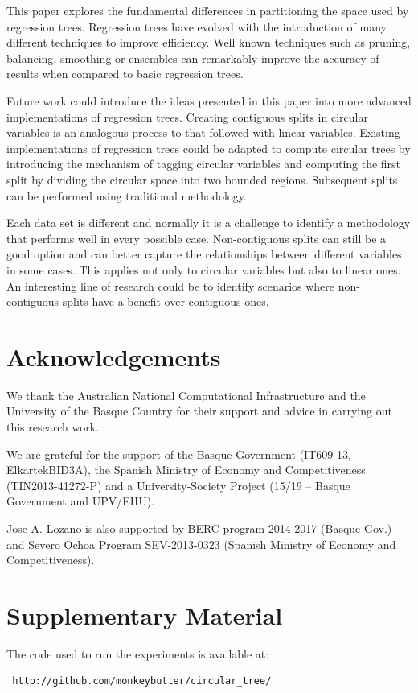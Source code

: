 \documentclass[times,twocolumn,final,authoryear]{elsarticle}
\begin{document}
This paper explores the fundamental differences in partitioning the space used by regression trees. Regression trees have evolved with the introduction of many different techniques to improve efficiency. Well known techniques such as pruning, balancing, smoothing \citep{Breimanetal1984, Quinlan1993} or ensembles \citep{Buhlmann2012} can remarkably improve the accuracy of results when compared to basic regression trees.

Future work could introduce the ideas presented in this paper into more advanced implementations of regression trees. Creating contiguous splits in circular variables is an analogous process to that followed with linear variables. Existing implementations of regression trees could be adapted to compute circular trees by introducing the mechanism of tagging circular variables and computing the first split by dividing the circular space into two bounded regions. Subsequent splits can be performed using traditional methodology.

Each data set is different and normally it is a challenge to identify a methodology that performs well in every possible case. Non-contiguous splits can still be a good option and can better capture the relationships between different variables in some cases. This applies not only to circular variables but also to linear ones. An interesting line of research could be to identify scenarios where non-contiguous splits have a benefit over contiguous ones.


\section*{Acknowledgements}

We thank the Australian National Computational Infrastructure and the University of the Basque Country for their support and advice in carrying out this research work.

We are grateful for the support of the Basque Government (IT609-13, ElkartekBID3A), the Spanish Ministry of Economy and Competitiveness (TIN2013-41272-P) and a University-Society Project (15/19 – Basque Government and UPV/EHU). 

Jose A. Lozano is also supported by BERC program 2014-2017 (Basque Gov.) and Severo Ochoa Program SEV-2013-0323 (Spanish Ministry of Economy and Competitiveness).






\section*{Supplementary Material}

The code used to run the experiments is available at:

\begin{verbatim}
 http://github.com/monkeybutter/circular_tree/
\end{verbatim}
\end{document}

